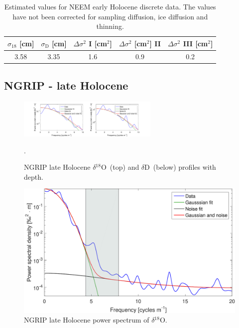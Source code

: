 \documentclass[11pt, draftcls, onecolumn]{IEEEtran} %
\numberwithin{equation}{section}
\numberwithin{table}{section}
\numberwithin{figure}{section}
\newcommand{\delOx}{$\delta{}^{18}\mathrm{O}$}
\newcommand{\delD}{$\delta\mathrm{D}$}
\begin{document}
\begin{appendices}
\begin{table}[H]
	\center
	\caption{Estimated values for NEEM early Holocene discrete data.
		The values have not been corrected for sampling diffusion, ice diffusion and thinning.}
	\label{NEEM_dis_tbl}
	\begin{tabular}{c c c c c} 
		\toprule
		$\sigma_{18}$ [cm] & $\sigma_\mathrm{D}$ [cm] & $\Delta\sigma^2$ I [cm$^2$] & $\Delta\sigma^2$ [cm$^2$] II & $\Delta\sigma^2$ III [cm$^2$] \\
		\midrule
		3.58 &   3.35 &     1.6 &     0.9 &     0.2 \\
		
		\bottomrule		
	\end{tabular}
\end{table}
\clearpage
\subsection{NGRIP - late Holocene}

\begin{figure}[H]
	\vspace*{2mm}
	\begin{center}
		\includegraphics[width=0.6\textwidth]{Figure_27}
		\caption{NGRIP late Holocene \delOx~(top) and \delD~(below) profiles with depth.}  \label{fig:NGRIP_late_holo}.
	\end{center}
\end{figure}


\begin{figure}[H]
	\vspace*{2mm}
	\begin{center}
		\includegraphics[width=.5\textwidth]{Figure_28}
		\caption{NGRIP late Holocene power spectrum of \delOx.}  \label{fig:NGRIP_late}
	\end{center}
\end{figure}


\end{appendices}
\end{document}
